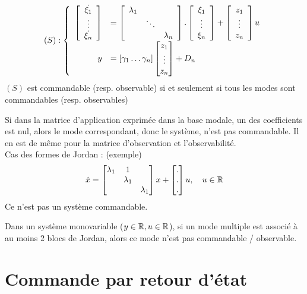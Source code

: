 \documentclass[main.tex]{subfiles}
\begin{document}
\[
(S) : \left\{
\begin{array}{rl}
\left[
\begin{array}{c}
\dot{\xi_1} \\
\vdots \\
\dot{\xi_n}
\end{array}
\right]
& = \left[
\begin{array}{ccc}
\lambda_1 \\
&\ddots \\
&& \lambda_n
\end{array}
\right]
.
\left[
\begin{array}{c}
\xi_1 \\
\vdots \\
\xi_n
\end{array}
\right]
+
\left[
\begin{array}{c}
z_1 \\
\vdots \\
z_n
\end{array}
\right]
u \\
y & = [\gamma_1 \dots \gamma_n]
\begin{bmatrix} z_1 \\ \vdots \\z_n \end{bmatrix}
+ D_n
\end{array}
\right.
\]
$(S)$ est commandable (resp. observable) si et seulement si tous les modes sont commandables (resp. observables)

Si dans la matrice d'application exprimée dans la base modale, un des coefficients est nul, alors le mode correspondant, donc le système, n'est pas commandable. Il en est de même pour la matrice d'observation et l'observabilité.\\

Cas des formes de Jordan : (exemple)
\[ \dot{x}= \begin{bmatrix}

    \lambda_1 & 1& \\
    & \lambda_1 & \\
    & &\lambda_1 \\
    \end{bmatrix}
x + \begin{bmatrix} .\\.\\.\\ \end{bmatrix} u, \quad u \in \mathbb{R}
\]
Ce n'est pas un système commandable.

Dans un système monovariable ($y\in\mathbb{R}, u\in\mathbb{R}$), si un mode multiple est associé à au moins 2 blocs de Jordan, alors ce mode n'est pas commandable / observable.

\section{Commande  par retour d'état}
\end{document}
